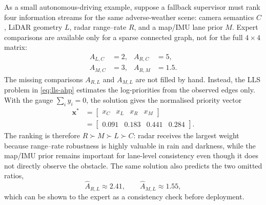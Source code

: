 \smallskip
\begin{example}
As a small autonomous-driving example, suppose a fallback supervisor must rank four information streams for the same adverse-weather scene: camera semantics \(C\), LiDAR geometry \(L\), radar range--rate \(R\), and a map/IMU lane prior \(M\). Expert comparisons are available only for a sparse connected graph, not for the full \(4\times4\) matrix:
\[
\begin{aligned}
A_{L,C}&=2, & A_{R,C}&=5,\\
A_{M,C}&=3, & A_{R,M}&=1.5 .
\end{aligned}
\]
The missing comparisons \(A_{R,L}\) and \(A_{M,L}\) are not filled by hand. Instead, the LLS problem in \eqref{eq:lls-ahp} estimates the log-priorities from the observed edges only. With the gauge \(\sum_i y_i=0\), the solution gives the normalised priority vector
\begin{equation}
\begin{aligned}
\bm{x}^{*}
&=\begin{bmatrix}x_C & x_L & x_R & x_M\end{bmatrix}\\
&=\begin{bmatrix}0.091 & 0.183 & 0.441 & 0.284\end{bmatrix}.
\end{aligned}
\label{eq:incomplete-ahp-example-weights}
\end{equation}
The ranking is therefore \(R \succ M \succ L \succ C\): radar receives the largest weight because range--rate robustness is highly valuable in rain and darkness, while the map/IMU prior remains important for lane-level consistency even though it does not directly observe the obstacle. The same solution also predicts the two omitted ratios,
\begin{equation}
\widehat{A}_{R,L}\approx2.41,\qquad
\widehat{A}_{M,L}\approx1.55,
\end{equation}
which can be shown to the expert as a consistency check before deployment.

\begin{figure}[t]
    \centering
\end{figure}
\end{example}
